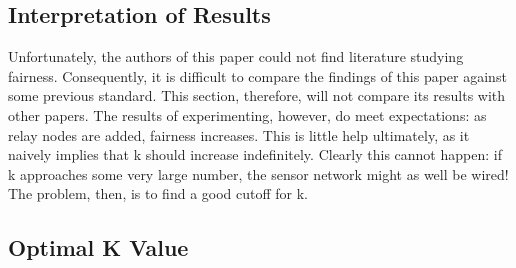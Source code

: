 \subsection{Interpretation of Results}

Unfortunately, the authors of this paper could not find literature studying fairness.  Consequently, it is difficult to compare the findings of this paper against some previous standard.  This section, therefore, will not compare its results with other papers.  The results of experimenting, however, do meet expectations: as relay nodes are added, fairness increases.  This is little help ultimately, as it naively implies that k should increase indefinitely.  Clearly this cannot happen: if k approaches some very large number, the sensor network might as well be wired!  The problem, then, is to find a good cutoff for k.

\subsection{Optimal K Value}

